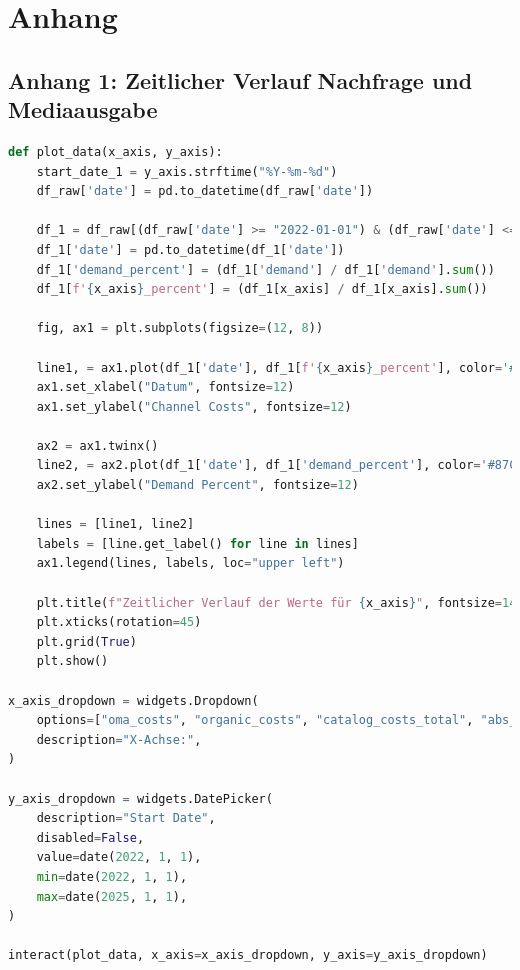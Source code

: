 \documentclass{common/nak}
\numberwithin{equation}{subsection}
\begin{document}
\newpage
\appendix
\section*{Anhang}
\label{anhang}
\subsection*{Anhang 1: Zeitlicher Verlauf Nachfrage und Mediaausgabe}
\label{Anhang1:ZeitlicherVerlaufMitPywidgets}
\UseRawInputEncoding
\begin{lstlisting}[language=Python, linewidth=\textwidth]
    def plot_data(x_axis, y_axis):
    start_date_1 = y_axis.strftime("%Y-%m-%d")
    df_raw['date'] = pd.to_datetime(df_raw['date'])
    
    df_1 = df_raw[(df_raw['date'] >= "2022-01-01") & (df_raw['date'] <= "2025-01-01")].copy() 
    df_1['date'] = pd.to_datetime(df_1['date'])
    df_1['demand_percent'] = (df_1['demand'] / df_1['demand'].sum())
    df_1[f'{x_axis}_percent'] = (df_1[x_axis] / df_1[x_axis].sum())
    
    fig, ax1 = plt.subplots(figsize=(12, 8))
    
    line1, = ax1.plot(df_1['date'], df_1[f'{x_axis}_percent'], color='#FF69B4', label=f"{x_axis}")
    ax1.set_xlabel("Datum", fontsize=12)
    ax1.set_ylabel("Channel Costs", fontsize=12)
    
    ax2 = ax1.twinx()
    line2, = ax2.plot(df_1['date'], df_1['demand_percent'], color='#87CEFA', label="Demand Percent")
    ax2.set_ylabel("Demand Percent", fontsize=12)
    
    lines = [line1, line2]
    labels = [line.get_label() for line in lines]
    ax1.legend(lines, labels, loc="upper left")
    
    plt.title(f"Zeitlicher Verlauf der Werte für {x_axis}", fontsize=14)
    plt.xticks(rotation=45)
    plt.grid(True)
    plt.show()

x_axis_dropdown = widgets.Dropdown(
    options=["oma_costs", "organic_costs", "catalog_costs_total", "abs_discount_value", "sum_vkb", "c_and_a_costs", "h_and_m_costs", "aboutyou_costs", "zalando_costs","mail_newsletter", "mail_trigger", "push_newsletter", "push_trigger""tv_costs", "podcast_costs", "addressable_tv_costs", "radio_costs", "dooh_ooh_costs", "youtube_costs", "olv_costs", "display_media_costs", "social_media_costs", "media_print_costs"],
    description="X-Achse:",
)

y_axis_dropdown = widgets.DatePicker(
    description="Start Date",
    disabled=False,
    value=date(2022, 1, 1),
    min=date(2022, 1, 1),  
    max=date(2025, 1, 1),
)

interact(plot_data, x_axis=x_axis_dropdown, y_axis=y_axis_dropdown)
\end{lstlisting}
\newpage
\end{document}
